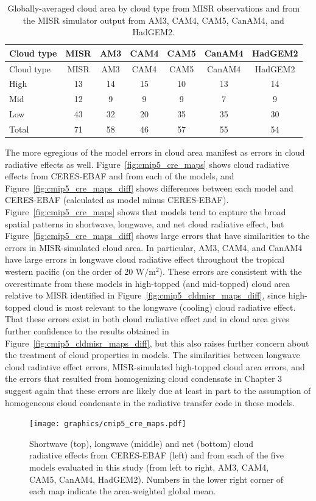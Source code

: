 \begin{longtable}[]{@{}lcccccc@{}}
\caption{\label{tbl:cmip5_cldmisr}Globally-averaged cloud area by cloud
type from MISR observations and from the MISR simulator output from AM3,
CAM4, CAM5, CanAM4, and HadGEM2. }\tabularnewline
\toprule
Cloud type & MISR & AM3 & CAM4 & CAM5 & CanAM4 & HadGEM2\tabularnewline
\midrule
\endfirsthead
\toprule
Cloud type & MISR & AM3 & CAM4 & CAM5 & CanAM4 & HadGEM2\tabularnewline
\midrule
\endhead
High & 13 & 14 & 15 & 10 & 13 & 14\tabularnewline
Mid & 12 & 9 & 9 & 9 & 7 & 9\tabularnewline
Low & 43 & 32 & 20 & 35 & 35 & 30\tabularnewline
Total & 71 & 58 & 46 & 57 & 55 & 54\tabularnewline
\bottomrule
\end{longtable}

The more egregious of the model errors in cloud area manifest as errors
in cloud radiative effects as well. Figure~\ref{fig:cmip5_cre_maps}
shows cloud radiative effects from CERES-EBAF and from each of the
models, and Figure~\ref{fig:cmip5_cre_maps_diff} shows differences
between each model and CERES-EBAF (calculated as model minus
CERES-EBAF). Figure~\ref{fig:cmip5_cre_maps} shows that models tend to
capture the broad spatial patterns in shortwave, longwave, and net cloud
radiative effect, but Figure~\ref{fig:cmip5_cre_maps_diff} shows large
errors that have similarities to the errors in MISR-simulated cloud
area. In particular, AM3, CAM4, and CanAM4 have large errors in longwave
cloud radiative effect throughout the tropical western pacific (on the
order of 20 \(\textrm{W}/\textrm{m}^2\)). These errors are consistent
with the overestimate from these models in high-topped (and mid-topped)
cloud area relative to MISR identified in
Figure~\ref{fig:cmip5_cldmisr_maps_diff}, since high-topped cloud is
most relevant to the longwave (cooling) cloud radiative effect. That
these errors exist in both cloud radiative effect and in cloud area
gives further confidence to the results obtained in
Figure~\ref{fig:cmip5_cldmisr_maps_diff}, but this also raises further
concern about the treatment of cloud properties in models. The
similarities between longwave cloud radiative effect errors,
MISR-simulated high-topped cloud area errors, and the errors that
resulted from homogenizing cloud condensate in Chapter 3 suggest again
that these errors are likely due at least in part to the assumption of
homogeneous cloud condensate in the radiative transfer code in these
models.

\begin{figure}[htbp]
\centering
\texttt{[image: graphics/cmip5\_cre\_maps.pdf]}
\caption{\label{fig:cmip5_cre_maps}Shortwave (top), longwave (middle)
and net (bottom) cloud radiative effects from CERES-EBAF (left) and from
each of the five models evaluated in this study (from left to right,
AM3, CAM4, CAM5, CanAM4, HadGEM2). Numbers in the lower right corner of
each map indicate the area-weighted global
mean.}\label{fig:cmip5ux5fcreux5fmaps}
\end{figure}

